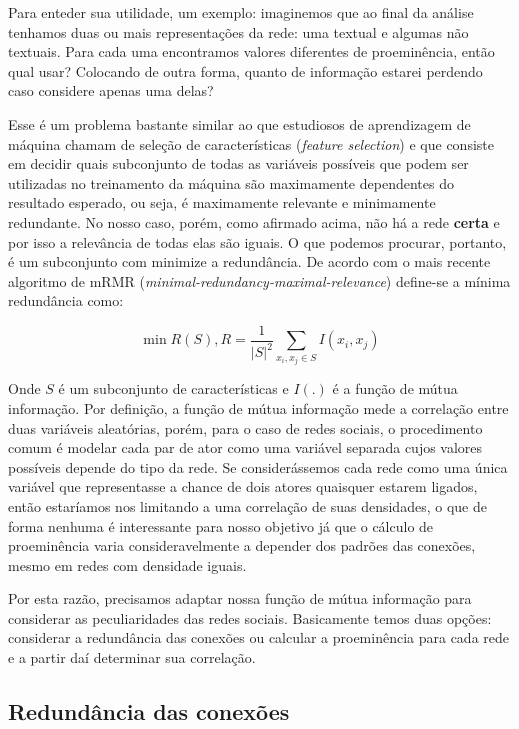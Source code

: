 \documentclass{article}
\begin{document}
Para enteder sua utilidade, um exemplo: imaginemos que ao final da análise
tenhamos duas ou mais representações da rede: uma textual e algumas não
textuais. Para cada uma encontramos valores diferentes de proeminência,
então qual usar? Colocando de outra forma, quanto de informação estarei perdendo
caso considere apenas uma delas? 

Esse é um problema bastante similar ao que estudiosos de aprendizagem de máquina
chamam de seleção de características (\textit{feature selection}) e que consiste
em decidir quais subconjunto de todas as variáveis possíveis que podem ser
utilizadas no treinamento da máquina são maximamente dependentes do resultado
esperado, ou seja, é maximamente relevante e minimamente redundante. No nosso
caso, porém, como afirmado acima, não há a rede \textbf{certa} e por isso a
relevância de todas elas são iguais. O que podemos procurar, portanto, é um
subconjunto com minimize a redundância. De acordo com o mais recente algoritmo
de mRMR (\textit{minimal-redundancy-maximal-relevance}) define-se a mínima
redundância como:

\begin{equation}
\label{def:min_redun}
\min R(S), R = \frac{1}{|S|^2}\sum_{x_i, x_j \in S}I(x_i, x_j)
\end{equation}

Onde $S$ é um subconjunto de características e $I(.)$ é a função de mútua
informação. Por definição, a função de mútua informação mede a correlação entre
duas variáveis aleatórias, porém, para o caso de redes sociais, o procedimento
comum é modelar cada par de ator como uma variável separada cujos valores
possíveis depende do tipo da rede. Se considerássemos cada rede como uma única
variável que representasse a chance de dois atores quaisquer estarem ligados,
então estaríamos nos limitando a uma correlação de suas densidades, o que de
forma nenhuma é interessante para nosso objetivo já que o cálculo de
proeminência varia consideravelmente a depender dos padrões das conexões,
mesmo em redes com densidade iguais.

Por esta razão, precisamos adaptar nossa função de mútua informação para
considerar as peculiaridades das redes sociais. Basicamente temos duas opções:
considerar a redundância das conexões ou calcular a proeminência para cada
rede e a partir daí determinar sua correlação. 

\subsection{Redundância das conexões}
\end{document}
